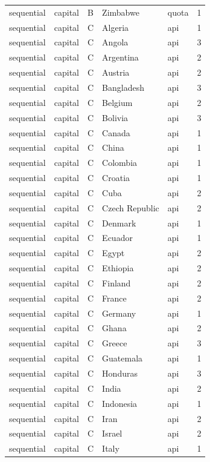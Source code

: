 \begin{tabular}{lllllr}
sequential & capital & B & Zimbabwe & quota & 1 \\
sequential & capital & C & Algeria & api & 1 \\
sequential & capital & C & Angola & api & 3 \\
sequential & capital & C & Argentina & api & 2 \\
sequential & capital & C & Austria & api & 2 \\
sequential & capital & C & Bangladesh & api & 3 \\
sequential & capital & C & Belgium & api & 2 \\
sequential & capital & C & Bolivia & api & 3 \\
sequential & capital & C & Canada & api & 1 \\
sequential & capital & C & China & api & 1 \\
sequential & capital & C & Colombia & api & 1 \\
sequential & capital & C & Croatia & api & 1 \\
sequential & capital & C & Cuba & api & 2 \\
sequential & capital & C & Czech Republic & api & 2 \\
sequential & capital & C & Denmark & api & 1 \\
sequential & capital & C & Ecuador & api & 1 \\
sequential & capital & C & Egypt & api & 2 \\
sequential & capital & C & Ethiopia & api & 2 \\
sequential & capital & C & Finland & api & 2 \\
sequential & capital & C & France & api & 2 \\
sequential & capital & C & Germany & api & 1 \\
sequential & capital & C & Ghana & api & 2 \\
sequential & capital & C & Greece & api & 3 \\
sequential & capital & C & Guatemala & api & 1 \\
sequential & capital & C & Honduras & api & 3 \\
sequential & capital & C & India & api & 2 \\
sequential & capital & C & Indonesia & api & 1 \\
sequential & capital & C & Iran & api & 2 \\
sequential & capital & C & Israel & api & 2 \\
sequential & capital & C & Italy & api & 1 \\

\end{tabular}
